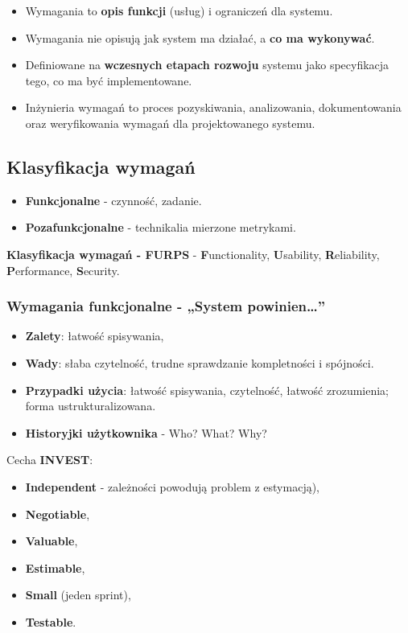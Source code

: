 \documentclass[../main.tex]{subfiles}
\begin{document}
    \begin{itemize}
        \item Wymagania to \textbf{opis funkcji} (usług) i ograniczeń dla systemu.
        \item Wymagania nie opisują jak system ma działać, a \textbf{co ma
        wykonywać}.
        \item Definiowane na \textbf{wczesnych etapach rozwoju} systemu jako specyfikacja tego, co ma być
        implementowane.
        \item Inżynieria wymagań to proces pozyskiwania, analizowania, dokumentowania oraz weryfikowania
        wymagań dla projektowanego systemu.

    \end{itemize}

    \subsection{Klasyfikacja wymagań}
    \begin{itemize}
        \item \textbf{Funkcjonalne} - czynność, zadanie.
        \item \textbf{Pozafunkcjonalne} - technikalia mierzone metrykami.
    \end{itemize}

    \textbf{Klasyfikacja wymagań - FURPS} - \textbf{F}unctionality, \textbf{U}sability, \textbf{R}eliability,
    \textbf{P}erformance, \textbf{S}ecurity.

    \subsubsection{Wymagania funkcjonalne - „System powinien\dots”}
    \begin{itemize}
        \item \textbf{Zalety}: łatwość spisywania,
        \item \textbf{Wady}: słaba czytelność, trudne sprawdzanie kompletności i spójności.
        \item \textbf{Przypadki użycia}:  łatwość spisywania, czytelność, łatwość zrozumienia; forma ustrukturalizowana.
        \item \textbf{Historyjki użytkownika} - Who? What? Why?
    \end{itemize}

    Cecha \textbf{INVEST}:
    \begin{itemize}
        \item \textbf{Independent} - zależności powodują problem z estymacją),
        \item \textbf{Negotiable},
        \item \textbf{Valuable},
        \item \textbf{Estimable},
        \item \textbf{Small} (jeden sprint),
        \item \textbf{Testable}.
    \end{itemize}
\end{document}
